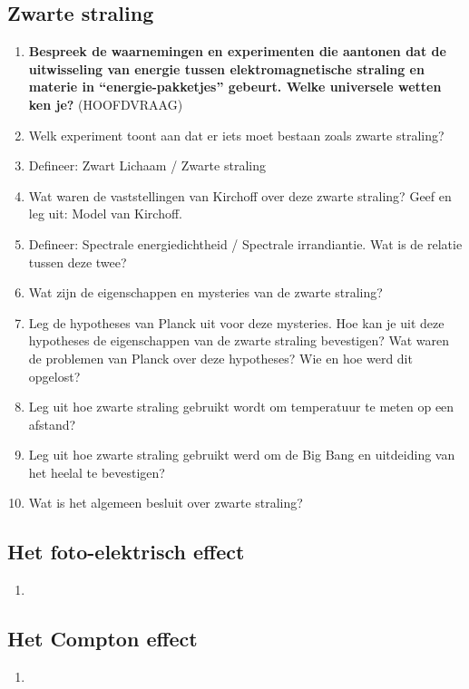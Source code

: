 \documentclass[12pt]{article}
\begin{document}
    \subsection{Zwarte straling}
    \begin{enumerate}
        \item \textbf{Bespreek de waarnemingen en experimenten die aantonen dat de uitwisseling van energie tussen elektromagnetische straling en materie in “energie-pakketjes” gebeurt. Welke universele wetten ken je?} (HOOFDVRAAG)
        \item Welk experiment toont aan dat er iets moet bestaan zoals zwarte straling?
        \item Defineer: Zwart Lichaam / Zwarte straling
        \item Wat waren de vaststellingen van Kirchoff over deze zwarte straling? Geef en leg uit: Model van Kirchoff.
        \item Defineer: Spectrale energiedichtheid / Spectrale irrandiantie. Wat is de relatie tussen deze twee?
        \item Wat zijn de eigenschappen en mysteries van de zwarte straling?
        \item Leg de hypotheses van Planck uit voor deze mysteries. Hoe kan je uit deze hypotheses de eigenschappen van de zwarte straling bevestigen? Wat waren de problemen van Planck over deze hypotheses? Wie en hoe werd dit opgelost?
        \item Leg uit hoe zwarte straling gebruikt wordt om temperatuur te meten op een afstand?
        \item Leg uit hoe zwarte straling gebruikt werd om de Big Bang en uitdeiding van het heelal te bevestigen?
        \item Wat is het algemeen besluit over zwarte straling?
    \end{enumerate}
    \subsection{Het foto-elektrisch effect}
    \begin{enumerate}
        \item 
    \end{enumerate}
    \subsection{Het Compton effect}
    \begin{enumerate}
        \item 
    \end{enumerate}
\end{document}

